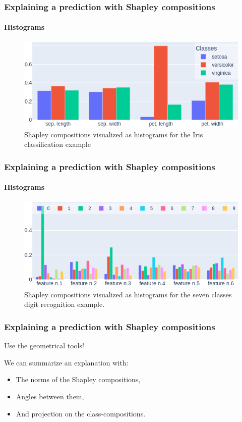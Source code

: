 \documentclass{beamer}
\begin{document}
\begin{frame}
  \frametitle{Explaining a prediction with Shapley compositions}
  \framesubtitle{Histograms}
  \begin{figure}
    \centering
    \includegraphics[width=0.9\linewidth]{../paper/figures/3classes/histo.png}
    \caption{Shapley compositions visualized as histograms
for the Iris classification example}
  \end{figure}
\end{frame}

\begin{frame}
  \frametitle{Explaining a prediction with Shapley compositions}
  \framesubtitle{Histograms}
  \begin{figure}
    \centering
    \includegraphics[width=0.9\linewidth]{../paper/figures/moreclasses/histo.png}
    \caption{Shapley compositions visualized as histograms for the seven classes digit recognition example.}
  \end{figure}
\end{frame}

\begin{frame}
  \frametitle{Explaining a prediction with Shapley compositions}

  \begin{center}
    Use the geometrical tools!
  \end{center}
  \vspace{0.2cm}
  
  We can summarize an explanation with:
  \begin{itemize}
  \item The norms of the Shapley compositions,
  \item Angles between them,
  \item And projection on the class-compositions.
  \end{itemize}
\end{frame}
\end{document}
